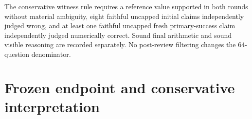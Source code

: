 \documentclass[11pt,a4paper]{article}
\begin{document}
The conservative witness rule requires a reference value supported in
both rounds without material ambiguity, eight faithful uncapped initial
claims independently judged wrong, and at least one faithful uncapped
fresh primary-success claim independently judged numerically correct.
Sound final arithmetic and sound visible reasoning are recorded
separately. No post-review filtering changes the 64-question
denominator.


\section{Frozen endpoint and conservative
interpretation}\label{frozen-endpoint-and-conservative-interpretation}

\end{document}
